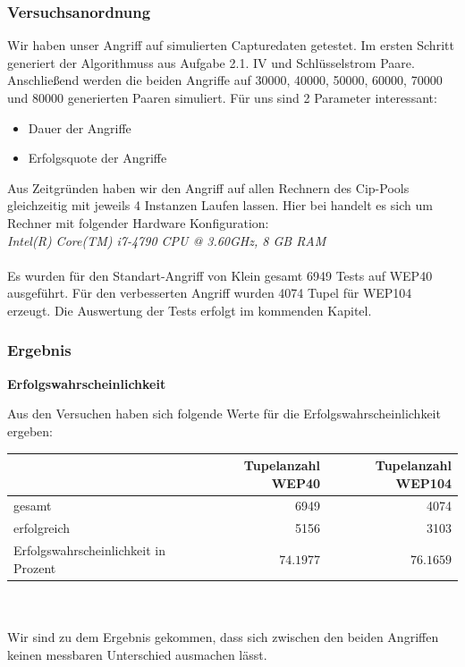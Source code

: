 \documentclass[10pt,a4paper]{article}
\begin{document}
\label{ssec:vergleich}


\subsubsection{Versuchsanordnung}
Wir haben unser Angriff auf simulierten Capturedaten getestet. Im ersten Schritt generiert der Algorithmuss aus Aufgabe 2.1. IV und Schlüsselstrom Paare. Anschließend werden die beiden Angriffe auf 30000, 40000, 50000, 60000, 70000 und 80000 generierten Paaren simuliert. Für uns sind 2 Parameter interessant: 
\begin{itemize}
	\item Dauer der Angriffe
	\item Erfolgsquote der Angriffe
\end{itemize}

Aus Zeitgründen haben wir den Angriff auf allen Rechnern des Cip-Pools gleichzeitig mit jeweils 4 Instanzen Laufen lassen.
Hier bei handelt es sich um Rechner mit folgender Hardware Konfiguration:
\\
\textit{Intel(R) Core(TM) i7-4790 CPU @ 3.60GHz, 8 GB RAM}
\\\\
Es wurden für den Standart-Angriff von Klein gesamt 6949 Tests auf WEP40 ausgeführt. Für den verbesserten Angriff wurden 4074 Tupel für WEP104 erzeugt. 
Die Auswertung der Tests erfolgt im kommenden Kapitel.
\subsubsection{Ergebnis}

\textbf{Erfolgswahrscheinlichkeit}

Aus den Versuchen haben sich folgende Werte für die Erfolgswahrscheinlichkeit ergeben:

\begin{tabular}{|l|r|r|}
	\hline
	 & Tupelanzahl WEP40 & Tupelanzahl WEP104 \\
	\hline
	gesamt & 6949 & 4074 \\
	\hline
	erfolgreich & 5156 & 3103\\
	\hline
	Erfolgswahrscheinlichkeit in Prozent & $~74.1977$ & $~76.1659$\\
	\hline
\end{tabular}
\\\\
Wir sind zu dem Ergebnis gekommen, dass sich zwischen den beiden Angriffen keinen messbaren Unterschied ausmachen lässt.\\
\end{document}
